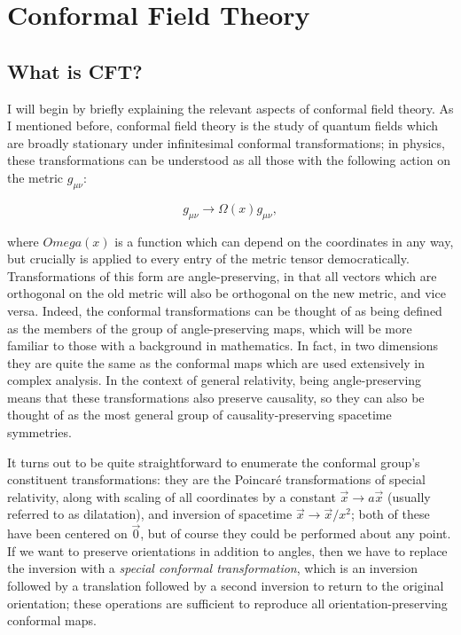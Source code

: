 \chapter{Conformal Field Theory}
\label{chap:cft}

\section{What is CFT?}
\label{sec:cft}

I will begin by briefly explaining the relevant aspects of conformal field 
theory. As I mentioned before, conformal field theory is the study of quantum
fields which are broadly stationary under infinitesimal conformal 
transformations; in physics, these transformations can be understood as all 
those with the following action on the metric $g_{\mu \nu}$:

\begin{equation}
    g_{\mu \nu} \to \Omega(x) g_{\mu \nu},
\end{equation}

where $Omega(x)$ is a function which can depend on the coordinates in any way,
but crucially is applied to every entry of the metric tensor democratically.
Transformations of this form are angle-preserving, in that all vectors which are
orthogonal on the old metric will also be orthogonal on the new metric, and vice
versa. Indeed, the conformal transformations can be thought of as being defined
as the members of the group of angle-preserving maps, which will be more 
familiar to those with a background in mathematics. In fact, in two dimensions 
they are quite the same as the conformal maps which are used extensively in 
complex analysis. In the context of general relativity, being angle-preserving 
means that these transformations also preserve causality, so they can also be
thought of as the most general group of causality-preserving spacetime 
symmetries.

It turns out to be quite straightforward to enumerate the conformal group's 
constituent transformations: they are the Poincar\'e transformations of special
relativity, along with scaling of all coordinates by a constant 
$\vec x \to a \vec x$ (usually referred to as dilatation), and inversion of 
spacetime $\vec x \to \vec x / x^2$; both of these have been centered on 
$\vec 0$, but of course they could be performed about any point. If we want to
preserve orientations in addition to angles, then we have to replace the 
inversion with a \emph{special conformal transformation}, which is an inversion
followed by a translation followed by a second inversion to return to the 
original orientation; these operations are sufficient to reproduce all 
orientation-preserving conformal maps.

